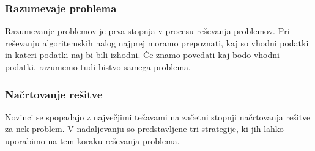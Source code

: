 
\subsubsection{Razumevaje problema}
\label{sec:razumevanje problema}

Razumevanje problemov je prva stopnja v procesu reševanja
problemov. Pri reševanju algoritemskih nalog najprej moramo
prepoznati, kaj so vhodni podatki in kateri podatki naj bi bili
izhodni. Če znamo povedati kaj bodo vhodni podatki, razumemo tudi
bistvo samega problema.

\subsubsection{Načrtovanje rešitve}
\label{sec:načrtovanje_rešitve}

Novinci se spopadajo z največjimi težavami na začetni stopnji
načrtovanja rešitve za nek problem. V nadaljevanju so predstavljene
tri strategije, ki jih lahko uporabimo na tem koraku reševanja
problema.

